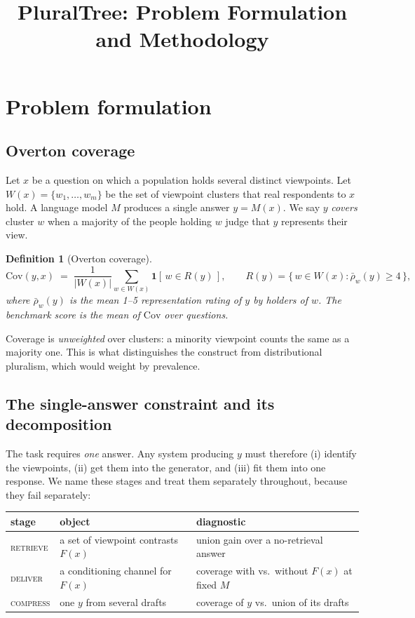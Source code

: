 \documentclass[11pt]{article}
\title{PluralTree: Problem Formulation and Methodology}
\author{}
\date{}
\newcommand{\cov}{\mathrm{Cov}}
\newtheorem{definition}{Definition}
\begin{document}
\maketitle

\section{Problem formulation}

\subsection{Overton coverage}

Let $x$ be a question on which a population holds several distinct viewpoints.
Let $W(x) = \{w_1,\dots,w_{m}\}$ be the set of viewpoint clusters that real
respondents to $x$ hold. A language model $M$ produces a single answer
$y = M(x)$. We say $y$ \emph{covers} cluster $w$ when a majority of the people
holding $w$ judge that $y$ represents their view.

\begin{definition}[Overton coverage]
\label{def:coverage}
\[
  \cov(y, x) \;=\; \frac{1}{|W(x)|}\sum_{w \in W(x)} \mathbf{1}\!\left[\,w \in R(y)\,\right],
  \qquad
  R(y) = \{\, w \in W(x) : \bar{\rho}_w(y) \ge 4 \,\},
\]
where $\bar{\rho}_w(y)$ is the mean 1--5 representation rating of $y$ by
holders of $w$. The benchmark score is the mean of $\cov$ over questions.
\end{definition}

Coverage is \emph{unweighted} over clusters: a minority viewpoint counts the
same as a majority one. This is what distinguishes the construct from
distributional pluralism, which would weight by prevalence.

\subsection{The single-answer constraint and its decomposition}

The task requires \emph{one} answer. Any system producing $y$ must therefore
(i) identify the viewpoints, (ii) get them into the generator, and (iii) fit
them into one response. We name these stages and treat them separately
throughout, because they fail separately:

\begin{center}
\begin{tabular}{@{}lll@{}}
\toprule
stage & object & diagnostic \\
\midrule
\textsc{retrieve} & a set of viewpoint contrasts $F(x)$ & union gain over a no-retrieval answer \\
\textsc{deliver}  & a conditioning channel for $F(x)$ & coverage with vs.\ without $F(x)$ at fixed $M$ \\
\textsc{compress} & one $y$ from several drafts & coverage of $y$ vs.\ union of its drafts \\
\bottomrule
\end{tabular}
\end{center}
\end{document}
